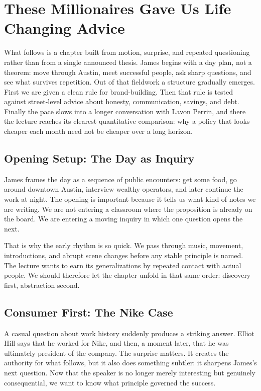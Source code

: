 \chapter{These Millionaires Gave Us Life Changing Advice}

What follows is a chapter built from motion, surprise, and repeated questioning rather than from a single announced thesis. James begins with a day plan, not a theorem: move through Austin, meet successful people, ask sharp questions, and see what survives repetition. Out of that fieldwork a structure gradually emerges. First we are given a clean rule for brand-building. Then that rule is tested against street-level advice about honesty, communication, savings, and debt. Finally the pace slows into a longer conversation with Lavon Perrin, and there the lecture reaches its clearest quantitative comparison: why a policy that looks cheaper each month need not be cheaper over a long horizon.

\section{Opening Setup: The Day as Inquiry}

James frames the day as a sequence of public encounters: get some food, go around downtown Austin, interview wealthy operators, and later continue the work at night. The opening is important because it tells us what kind of notes we are writing. We are not entering a classroom where the proposition is already on the board. We are entering a moving inquiry in which one question opens the next.

That is why the early rhythm is so quick. We pass through music, movement, introductions, and abrupt scene changes before any stable principle is named. The lecture wants to earn its generalizations by repeated contact with actual people. We should therefore let the chapter unfold in that same order: discovery first, abstraction second.

\section{Consumer First: The Nike Case}

A casual question about work history suddenly produces a striking answer. Elliot Hill says that he worked for Nike, and then, a moment later, that he was ultimately president of the company. The surprise matters. It creates the authority for what follows, but it also does something subtler: it sharpens James's next question. Now that the speaker is no longer merely interesting but genuinely consequential, we want to know what principle governed the success.

